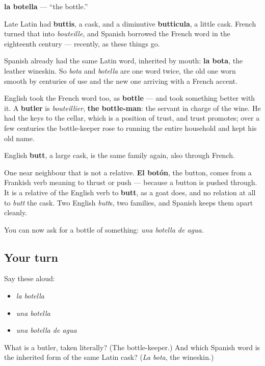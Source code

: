 \begin{cousinweb}
\textbf{la botella} — \textquotedblleft{}the bottle.\textquotedblright{}

Late Latin had \textbf{buttis}, a cask, and a diminutive \textbf{butticula}, a little cask. French turned that into \emph{bouteille}, and Spanish borrowed the French word in the eighteenth century — recently, as these things go.

Spanish already had the same Latin word, inherited by mouth: \textbf{la bota}, the leather wineskin. So \emph{bota} and \emph{botella} are one word twice, the old one worn smooth by centuries of use and the new one arriving with a French accent.

English took the French word too, as \textbf{bottle} — and took something better with it. A \textbf{butler} is \emph{bouteillier}, \textbf{the bottle-man}: the servant in charge of the wine. He had the keys to the cellar, which is a position of trust, and trust promotes; over a few centuries the bottle-keeper rose to running the entire household and kept his old name.

English \textbf{butt}, a large cask, is the same family again, also through French.

One near neighbour that is not a relative. \textbf{El botón}, the button, comes from a Frankish verb meaning to thrust or push — because a button is pushed through. It is a relative of the English verb to \textbf{butt}, as a goat does, and no relation at all to \emph{butt} the cask. Two English \emph{butt}s, two families, and Spanish keeps them apart cleanly.
\end{cousinweb}

\begin{grammarlens}[title={What you've built}]
You can now ask for a bottle of something: \emph{una botella de agua}.
\end{grammarlens}

\subsection*{Your turn}
Say these aloud:

\begin{itemize}
\raggedright
  \item \emph{la botella}
  \item \emph{una botella}
  \item \emph{una botella de agua}
\end{itemize}

\begin{tcolorbox}[breakable,colback=teal!4,colframe=teal!35!black,title={Before you move on}]
What is a butler, taken literally? (The bottle-keeper.) And which Spanish word is the inherited form of the same Latin cask? (\emph{La bota}, the wineskin.)
\end{tcolorbox}
